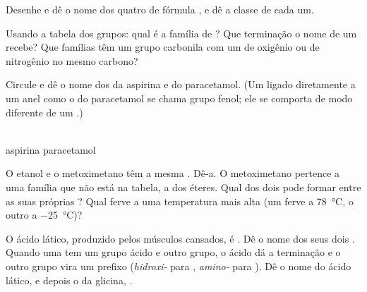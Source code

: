 \begin{exercise}[$\star\star$]\label{exo:g11:functional-groups:10}
Desenhe e dê o nome dos quatro  de fórmula , e dê a
classe de cada um.
\end{exercise}

\begin{exercise}[$\star\star$]\label{exo:g11:functional-groups:11}
Usando a tabela dos grupos: qual é a família de ? Que
terminação o nome de um  recebe? Que famílias têm um grupo
carbonila com um  de oxigênio ou de nitrogênio no mesmo carbono?
\end{exercise}

\begin{exercise}[$\star\star\star$]\label{exo:g11:functional-groups:12}
Circule e dê o nome dos  da aspirina e do paracetamol.
(Um  ligado diretamente a um anel como o do paracetamol se chama
grupo fenol; ele se comporta de modo diferente de um .)
\begin{center}
\qquad
{}
\\[2pt] \small aspirina \hspace{4.2cm} paracetamol
\end{center}
\end{exercise}

\begin{exercise}[$\star\star\star$]\label{exo:g11:functional-groups:13}
O etanol  e o metoximetano  têm a mesma
. Dê-a. O metoximetano pertence a uma família que não
está na tabela, a dos éteres. Qual dos dois pode formar  entre as suas próprias ? Qual ferve a uma
temperatura mais alta (um ferve a \qty{78}{\celsius}, o outro a
\qty{-25}{\celsius})?
\end{exercise}

\begin{exercise}[$\star\star\star$]\label{exo:g11:functional-groups:14}
O ácido lático, produzido pelos músculos cansados, é
. Dê o nome dos seus dois . Quando uma  tem um grupo ácido e outro grupo, o
ácido dá a terminação e o outro grupo vira um prefixo (\emph{hidroxi-}
para , \emph{amino-} para ). Dê o nome do ácido lático,
e depois o da glicina, .
\end{exercise}

